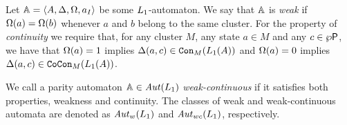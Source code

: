 \begin{definition}
\label{d:wk}
\label{d:ctwk}
Let $\bbA = \tup{A,\tmap,\pmap,a_I}$ be some $\oslang$-automaton.
We say that $\bbA$ is \emph{weak} if $\pmap(a) = \pmap(b)$ whenever $a$ and $b$
belong to the same cluster.
For the property of \emph{continuity} we require that, for any cluster $M$, any
state $a \in M$ and any $c \in \pow\pprop$, we have that 
$\pmap(a) = 1$ implies $\tmap(a,c) \in \cont{\oslang(A)}{M}$
and 
$\pmap(a) = 0$ implies $\tmap(a,c) \in \cocont{\oslang(A)}{M}$.

We call a parity automaton $\bbA \in \Aut(\oslang)$ \emph{weak-continuous} if it 
satisfies both properties, weakness and continuity.
The classes of weak and weak-continuous automata are denoted as $\AutW(\oslang)$
and $\AutWC(\oslang)$, respectively.
\end{definition}


